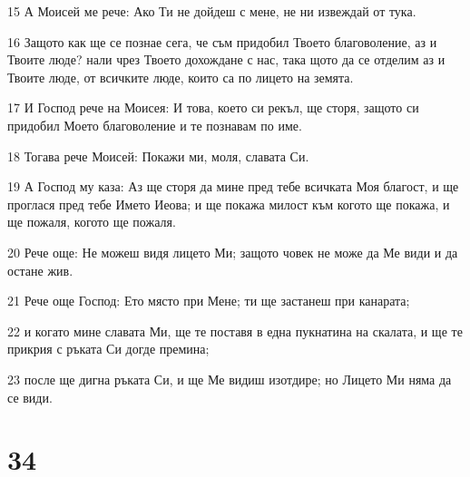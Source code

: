 \par 15 А Моисей ме рече: Ако Ти не дойдеш с мене, не ни извеждай от тука.
\par 16 Защото как ще се познае сега, че съм придобил Твоето благоволение, аз и Твоите люде? нали чрез Твоето дохождане с нас, така щото да се отделим аз и Твоите люде, от всичките люде, които са по лицето на земята.
\par 17 И Господ рече на Моисея: И това, което си рекъл, ще сторя, защото си придобил Моето благоволение и те познавам по име.
\par 18 Тогава рече Моисей: Покажи ми, моля, славата Си.
\par 19 А Господ му каза: Аз ще сторя да мине пред тебе всичката Моя благост, и ще проглася пред тебе Името Иеова; и ще покажа милост към когото ще покажа, и ще пожаля, когото ще пожаля.
\par 20 Рече още: Не можеш видя лицето Ми; защото човек не може да Ме види и да остане жив.
\par 21 Рече още Господ: Ето място при Мене; ти ще застанеш при канарата;
\par 22 и когато мине славата Ми, ще те поставя в една пукнатина на скалата, и ще те прикрия с ръката Си догде премина;
\par 23 после ще дигна ръката Си, и ще Ме видиш изотдире; но Лицето Ми няма да се види.

\chapter{34}

